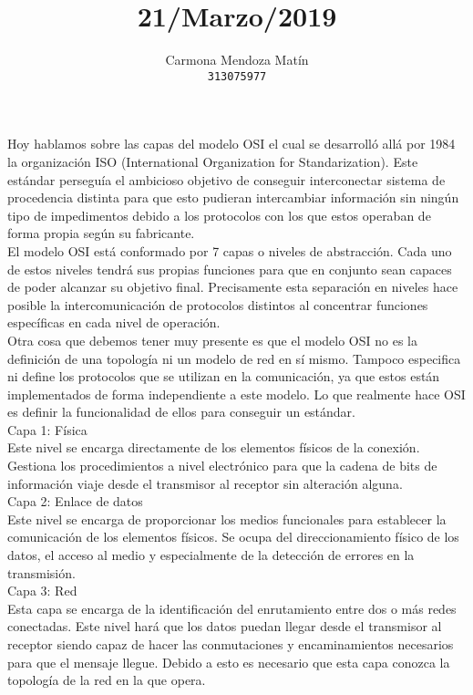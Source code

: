 \documentclass[11pt, a4paper]{report}
\begin{document}
\title{21/Marzo/2019}
\author{
  Carmona Mendoza Mat\'in\\
  \texttt{313075977}
}
\date{}
\maketitle

Hoy hablamos sobre las capas del modelo OSI el cual se desarrolló allá por 1984
la organización ISO (International Organization for Standarization). Este
estándar perseguía el ambicioso objetivo de conseguir interconectar sistema de
procedencia distinta para que esto pudieran intercambiar información sin ningún
tipo de impedimentos debido a los protocolos con los que estos operaban de
forma propia según su fabricante. \\

El modelo OSI está conformado por 7 capas o niveles de abstracción. Cada uno de
estos niveles tendrá sus propias funciones para que en conjunto sean capaces de
poder alcanzar su objetivo final. Precisamente esta separación en niveles hace
posible la intercomunicación de protocolos distintos al concentrar funciones
específicas en cada nivel de operación. \\

Otra cosa que debemos tener muy presente es que el modelo OSI no es la
definición de una topología ni un modelo de red en sí mismo. Tampoco especifica
ni define los protocolos que se utilizan en la comunicación, ya que estos están
implementados de forma independiente a este modelo. Lo que realmente hace OSI
es definir la funcionalidad de ellos para conseguir un estándar. \\

Capa 1: Física\\
Este nivel se encarga directamente de los elementos físicos de la conexión.
Gestiona los procedimientos a nivel electrónico para que la cadena de bits de
información viaje desde el transmisor al receptor sin alteración alguna. \\

Capa 2: Enlace de datos \\
Este nivel se encarga de proporcionar los medios funcionales para establecer la
comunicación de los elementos físicos. Se ocupa del direccionamiento físico de
los datos, el acceso al medio y especialmente de la detección de errores en la
transmisión. \\

Capa 3: Red \\
Esta capa se encarga de la identificación del enrutamiento entre dos o más
redes conectadas. Este nivel hará que los datos puedan llegar desde el
transmisor al receptor siendo capaz de hacer las conmutaciones y
encaminamientos necesarios para que el mensaje llegue. Debido a esto es
necesario que esta capa conozca la topología de la red en la que opera. \\
\end{document}
